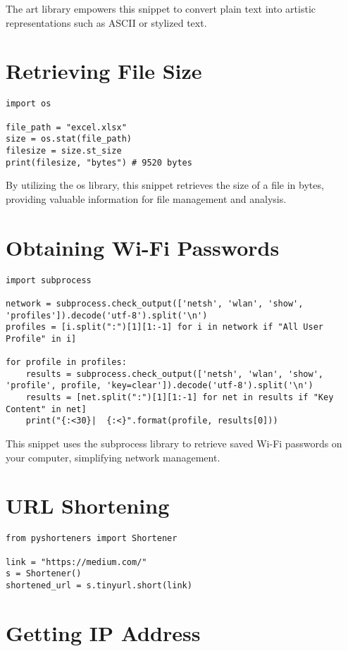 The art library empowers this snippet to convert plain text into artistic representations such as ASCII or stylized text.

\section{Retrieving File Size}


\begin{lstlisting}
import os

file_path = "excel.xlsx"
size = os.stat(file_path)
filesize = size.st_size
print(filesize, "bytes") # 9520 bytes
\end{lstlisting}

By utilizing the os library, this snippet retrieves the size of a file in bytes, providing valuable information for file management and analysis.

\section{Obtaining Wi-Fi Passwords}

\begin{lstlisting}
import subprocess

network = subprocess.check_output(['netsh', 'wlan', 'show', 'profiles']).decode('utf-8').split('\n')
profiles = [i.split(":")[1][1:-1] for i in network if "All User Profile" in i]

for profile in profiles:
    results = subprocess.check_output(['netsh', 'wlan', 'show', 'profile', profile, 'key=clear']).decode('utf-8').split('\n')
    results = [net.split(":")[1][1:-1] for net in results if "Key Content" in net]
    print("{:<30}|  {:<}".format(profile, results[0]))
\end{lstlisting}

This snippet uses the subprocess library to retrieve saved Wi-Fi passwords on your computer, simplifying network management.

\section{URL Shortening}

\begin{lstlisting}
from pyshorteners import Shortener

link = "https://medium.com/"
s = Shortener()
shortened_url = s.tinyurl.short(link)
\end{lstlisting}

\section{Getting IP Address}

